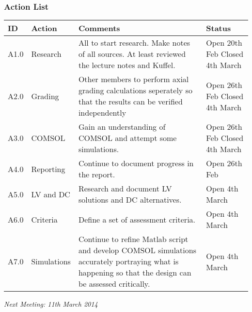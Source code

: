 \subsubsection{Action List}
\begin{center}
\begin{longtable}{| p{} | >{\raggedright\arraybackslash}p{} |  p{} | >{\raggedright\arraybackslash}p{}|} \hline
\textbf{ID} & \textbf{Action} & \textbf{Comments} & \textbf{Status} \\ \hline
\endhead
A1.0	&	Research	&	All to start research. Make notes of all sources. At least reviewed the lecture notes and Kuffel.	& Open 20th Feb Closed 4th March \\ \hline
A2.0	&	Grading	&	Other members to perform axial grading calculations seperately so that the results can be verified independently	& Open 26th Feb Closed 4th March \\ \hline
A3.0	&	COMSOL	&	Gain an understanding of COMSOL and attempt some simulations. & Open 26th Feb Closed 4th March\\ \hline
A4.0	&	Reporting	&	Continue to document progress in the report.	&	Open 26th Feb \\ \hline
A5.0	&	LV and DC	&	Research and document LV solutions and DC alternatives.	&	Open 4th March\\ \hline
A6.0	&	Criteria	&	Define a set of assessment criteria.	&	Open 4th March\\ \hline
A7.0	&	Simulations	&	Continue to refine Matlab script and develop COMSOL simulations accurately portraying what is happening so that the design can be assessed critically.	&	Open 4th March\\ \hline
	
\end{longtable}
\end{center}

\emph{Next Meeting: 11th March 2014}